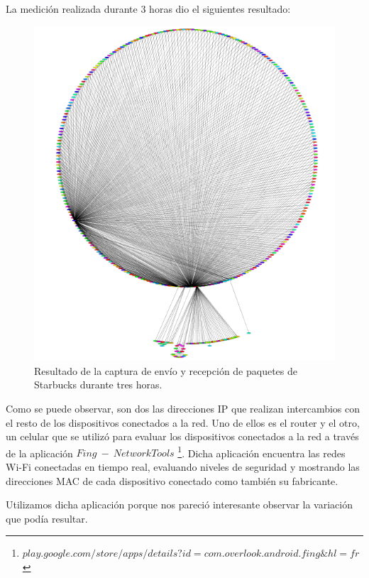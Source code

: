 \documentclass[10pt, a4paper]{article}
\begin{document}
La medición realizada durante 3 horas dio el siguientes resultado:
\begin{figure}[H] %
\begin{center}
\includegraphics[width=400pt]{../imgs/starbucks_entero.png}
\caption{Resultado de la captura de envío y recepción de paquetes de Starbucks durante tres horas.}
\end{center}
\end{figure}

Como se puede observar, son dos las direcciones IP que realizan intercambios con el resto de los dispositivos conectados a la red. Uno de ellos es el router y el otro, un celular que se utilizó para evaluar los dispositivos conectados a la red a través de la aplicación $Fing\ -\ Network Tools$ \footnote{$play.google.com/store/apps/details?id=com.overlook.android.fing\&hl=fr$}. Dicha aplicación encuentra las redes Wi-Fi conectadas en tiempo real, evaluando niveles de seguridad y mostrando las direcciones MAC de cada dispositivo conectado como también su fabricante.

Utilizamos dicha aplicación porque nos pareció interesante observar la variación que podía resultar.
\end{document}
